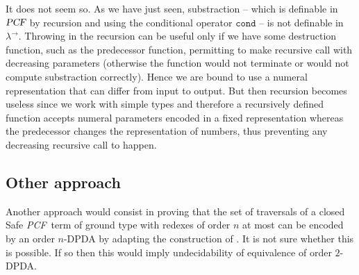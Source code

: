 \documentclass{article}
\newcommand\nat{\mathbb{N}}
\newcommand{\betared}{\rightarrow_\beta}
\newcommand{\encode}[1]{\ulcorner #1 \urcorner}
\newcommand\pcf{\textsl{PCF}}
\newcommand\pcfcond{\texttt{cond}}
\begin{document}
It does not seem so. As we have just seen, substraction -- which is definable in $\pcf$  by recursion and using the conditional operator $\pcfcond$ -- is not definable in $\lambda^\rightarrow$. Throwing in the recursion
can  be useful only if we have some destruction function, such as the predecessor function, permitting to make recursive call with decreasing parameters (otherwise the function would not terminate or would not compute substraction correctly). Hence we are bound to use a numeral representation
that can differ from input to output. But then recursion becomes useless since we work with simple types and therefore a recursively defined function accepts numeral parameters encoded in a fixed representation whereas the predecessor changes the representation of numbers, thus preventing any decreasing recursive call to happen.

%
%
%

\subsection{Other approach}

Another approach would consist in proving that the set of traversals of a closed Safe \pcf\ term of ground type with redexes of order $n$ at most can be encoded by an order $n$-DPDA by adapting the construction of \cite{KNU02}. It is not sure whether this is possible. If so then this would imply undecidability of equivalence of order $2$-DPDA.




\end{document}
